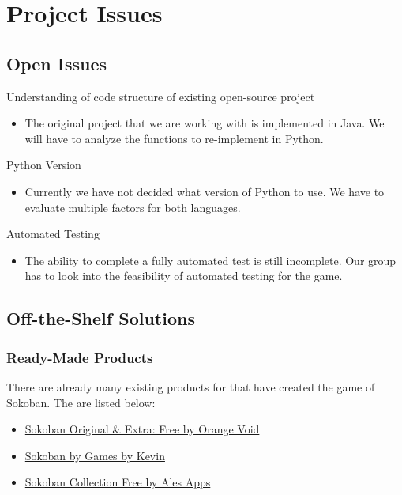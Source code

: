 \documentclass[12pt, titlepage]{article}
\begin{document}
\section{Project Issues}

\subsection{Open Issues}

\noindent Understanding of code structure of existing open-source project
\begin{itemize}
    \item The original project that we are working with is implemented in Java. We will have to analyze the functions to re-implement in Python.
\end{itemize}

\noindent Python Version
\begin{itemize}
    \item Currently we have not decided what version of Python to use. We have to evaluate multiple factors for both languages.
\end{itemize} 

\noindent Automated Testing
\begin{itemize}
    \item The ability to complete a fully automated test is still incomplete. Our group has to look into the feasibility of automated testing for the game.
\end{itemize}

\subsection{Off-the-Shelf Solutions}
\subsubsection{Ready-Made Products}
There are already many existing products for that have created the game of Sokoban. The are listed below:

\begin{itemize}
    \item \href{https://play.google.com/store/apps/details?id=br.com.orangevoid.sokobanfree}{Sokoban Original \& Extra: Free by Orange Void}
    \item \href{https://play.google.com/store/apps/details?id=com.gamesbykevin.sokoban}{Sokoban by Games by Kevin}
    \item \href{https://play.google.com/store/apps/details?id=org.alesapps.sokobanfree}{Sokoban Collection Free by Ales Apps}
\end{itemize}
\end{document}

